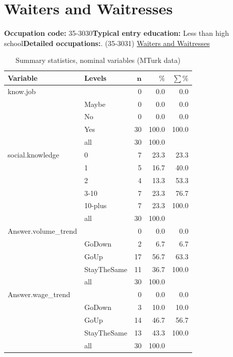 \documentclass[a4paper,10pt]{article}\usepackage[]{graphicx}\usepackage[]{color}
\begin{document}
\newpage\section{Waiters and Waitresses}\textbf{Occupation code:} 35-3030\newline\textbf{Typical entry education:} Less than high school\newline\textbf{Detailed occupations:}. (35-3031)  \href{http://www.bls.gov/oes/current/oes353031.htm}{Waiters and Waitresses}\newline%
\begin{table}[ht]
\centering
{\footnotesize
\begin{tabular}{ll|rrr}
 \textbf{Variable} & \textbf{Levels} & $\mathbf{n}$ & $\mathbf{\%}$ & $\mathbf{\sum \%}$ \\ 
  \hline
know.job &  & 0 & 0.0 & 0.0 \\ 
   & Maybe & 0 & 0.0 & 0.0 \\ 
   & No & 0 & 0.0 & 0.0 \\ 
   & Yes & 30 & 100.0 & 100.0 \\ 
   \hline
 & all & 30 & 100.0 &  \\ 
   \hline
\hline
social.knowledge & 0 & 7 & 23.3 & 23.3 \\ 
   & 1 & 5 & 16.7 & 40.0 \\ 
   & 2 & 4 & 13.3 & 53.3 \\ 
   & 3-10 & 7 & 23.3 & 76.7 \\ 
   & 10-plus & 7 & 23.3 & 100.0 \\ 
   \hline
 & all & 30 & 100.0 &  \\ 
   \hline
\hline
Answer.volume\_trend &  & 0 & 0.0 & 0.0 \\ 
   & GoDown & 2 & 6.7 & 6.7 \\ 
   & GoUp & 17 & 56.7 & 63.3 \\ 
   & StayTheSame & 11 & 36.7 & 100.0 \\ 
   \hline
 & all & 30 & 100.0 &  \\ 
   \hline
\hline
Answer.wage\_trend &  & 0 & 0.0 & 0.0 \\ 
   & GoDown & 3 & 10.0 & 10.0 \\ 
   & GoUp & 14 & 46.7 & 56.7 \\ 
   & StayTheSame & 13 & 43.3 & 100.0 \\ 
   \hline
 & all & 30 & 100.0 &  \\ 
   \hline
\hline
\end{tabular}
}
\caption{Summary statistics, nominal variables (MTurk data)} 
\label{tab1:35-3030}
\end{table}
\end{document}
